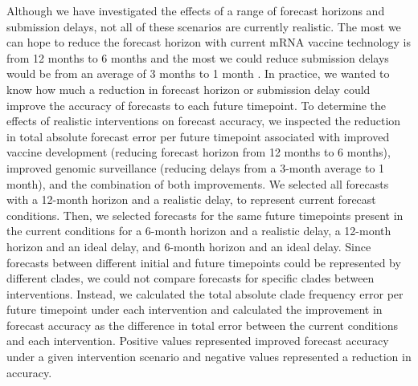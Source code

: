 \documentclass[9pt,lineno]{elife}
\begin{document}
Although we have investigated the effects of a range of forecast horizons and submission delays, not all of these scenarios are currently realistic.
The most we can hope to reduce the forecast horizon with current mRNA vaccine technology is from 12 months to 6 months and the most we could reduce submission delays would be from an average of 3 months to 1 month \citep{Grant2023}.
In practice, we wanted to know how much a reduction in forecast horizon or submission delay could improve the accuracy of forecasts to each future timepoint.
To determine the effects of realistic interventions on forecast accuracy, we inspected the reduction in total absolute forecast error per future timepoint associated with improved vaccine development (reducing forecast horizon from 12 months to 6 months), improved genomic surveillance (reducing delays from a 3-month average to 1 month), and the combination of both improvements.
We selected all forecasts with a 12-month horizon and a realistic delay, to represent current forecast conditions.
Then, we selected forecasts for the same future timepoints present in the current conditions for a 6-month horizon and a realistic delay, a 12-month horizon and an ideal delay, and 6-month horizon and an ideal delay.
Since forecasts between different initial and future timepoints could be represented by different clades, we could not compare forecasts for specific clades between interventions.
Instead, we calculated the total absolute clade frequency error per future timepoint under each intervention and calculated the improvement in forecast accuracy as the difference in total error between the current conditions and each intervention.
Positive values represented improved forecast accuracy under a given intervention scenario and negative values represented a reduction in accuracy.
\end{document}
